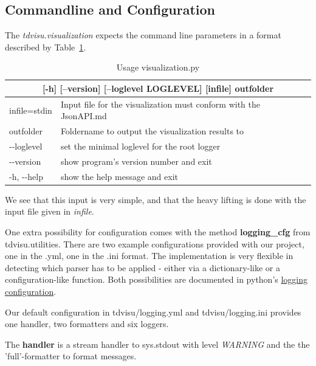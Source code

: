 \documentclass[a4paper, 12pt, bibliography=totoc]{scrartcl}
\begin{document}
\subsection{Commandline and Configuration}

The \textit{tdvisu.visualization} expects the command line parameters in a format described by Table~\ref{tab:optionstdvisu}.

\def\arraystretch{1.2}%
\begin{longtable}{|ll|}
	\caption{Usage visualization.py 
		\label{tab:optionstdvisu}}\\
	\hline 
	\multicolumn{2}{|c|}{[-h] [--version] [--loglevel LOGLEVEL] [infile] outfolder}
	\\[2ex]
	\endfirsthead

	infile=stdin &  Input file for the visualization must conform with the JsonAPI.md\\
	outfolder &  Foldername to output the visualization results to\\
	-{}-loglevel  &   set the minimal loglevel for the root logger\\
	-{}-version & show program's version number and exit\\
	-h, -{}-help & show the help message and exit\\
	\hline
\end{longtable}

We see that this input is very simple, and that the heavy lifting is done with the input file given in \textit{infile}.

One extra possibility for configuration comes with the method \textbf{logging\_cfg} from {tdvisu.utilities}. There are two example configurations provided with our project, one in the .yml, one in the .ini format. The implementation is very flexible in detecting which parser has to be applied - either via a dictionary-like or a configuration-like function. Both possibilities are documented in python's \href{https://docs.python.org/3/library/logging.config.html#logging-config-api}{logging configuration}.

Our default configuration in tdvisu/logging.yml and tdvisu/logging.ini provides one handler, two formatters and six loggers.

The \textbf{handler} is a stream handler to sys.stdout with level \textit{WARNING} and the the 'full'-formatter to format messages.
\end{document}
